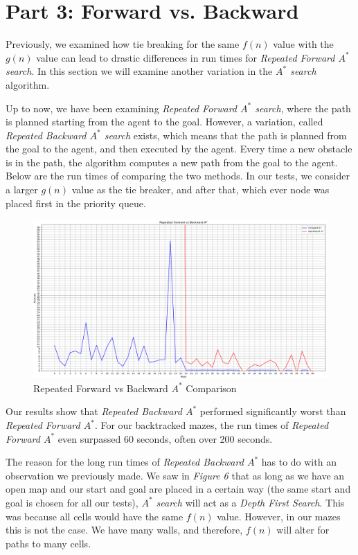 
\section{Part 3: Forward vs. Backward }
\label{sec: Part 2}

Previously, we examined how tie breaking for the same $f(n)$ value with the $g(n)$ value can lead to drastic differences in run times for \emph{Repeated Forward $A^*$ search}. In this section we will examine another variation in the \emph{$A^*$ search} algorithm.


Up to now, we have been examining \emph{Repeated Forward $A^*$ search}, where the path is planned starting from the agent to the goal. However, a variation, called \emph{Repeated Backward $A^*$ search} exists, which means that the path is planned from the goal to the agent, and then executed by the agent. Every time a new obstacle is in the path, the algorithm computes a new path from the goal to the agent. Below are the run times of comparing the two methods. In our tests, we consider a larger $g(n)$ value as the tie breaker, and after that, which ever node was placed first in the priority queue.

\begin{figure}[H]
  \centering
  \includegraphics[width=1\linewidth]{Report/Part3/Figure_2.png}  
\caption{Repeated Forward vs Backward $A^*$ Comparison}
\end{figure}

Our results show that \emph{Repeated Backward $A^*$} performed significantly worst than \emph{Repeated Forward $A^*$}. For our backtracked mazes, the run times of \emph{Repeated Forward $A^*$} even surpassed 60 seconds, often over 200 seconds.


The reason for the long run times of \emph{Repeated Backward $A^*$} has to do with an observation we previously made. We saw in \emph{Figure 6} that as long as we have an open map and our start and goal are placed in a certain way (the same start and goal is chosen for all our tests), \emph{$A^*$ search} will act as a \emph{Depth First Search}. This was because all cells would have the same $f(n)$ value. However, in our mazes this is not the case. We have many walls, and therefore, $f(n)$ will alter for paths to many cells. 


